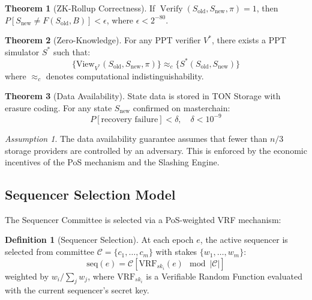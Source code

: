 \documentclass[12pt,a4paper]{article}
\theoremstyle{definition}
\newtheorem{definition}{Definition}[section]
\newtheorem{theorem}{Theorem}[section]
\theoremstyle{remark}
\newtheorem{assumption}{Assumption}[section]
\DeclareMathOperator{\Verify}{Verify}
\begin{document}
\begin{theorem}[ZK-Rollup Correctness]
\label{thm:zk-correctness}
If $\Verify(S_{\text{old}}, S_{\text{new}}, \pi) = 1$, then $P[S_{\text{new}} \neq F(S_{\text{old}}, B)] < \epsilon$, where $\epsilon < 2^{-80}$.
\end{theorem}

\begin{theorem}[Zero-Knowledge]
\label{thm:zk-privacy}
For any PPT verifier $V^*$, there exists a PPT simulator $S^*$ such that:
\begin{equation}
\{\text{View}_{V^*}(S_{\text{old}}, S_{\text{new}}, \pi)\} \approx_c \{S^*(S_{\text{old}}, S_{\text{new}})\}
\end{equation}
where $\approx_c$ denotes computational indistinguishability.
\end{theorem}

\begin{theorem}[Data Availability]
\label{thm:da-guarantee}
State data is stored in TON Storage with erasure coding. For any state $S_{\text{new}}$ confirmed on masterchain:
\begin{equation}
P[\text{recovery failure}] < \delta, \quad \delta < 10^{-9}
\end{equation}
\end{theorem}

\begin{assumption}
The data availability guarantee assumes that fewer than $n/3$ storage providers are controlled by an adversary. This is enforced by the economic incentives of the PoS mechanism and the Slashing Engine.
\end{assumption}

\subsection{Sequencer Selection Model}
\label{sec:sequencer-selection}

The Sequencer Committee is selected via a PoS-weighted VRF mechanism:

\begin{definition}[Sequencer Selection]
At each epoch $e$, the active sequencer is selected from committee $\mathcal{C} = \{c_1, \ldots, c_m\}$ with stakes $\{w_1, \ldots, w_m\}$:
\begin{equation}
\text{seq}(e) = \mathcal{C}\left[\text{VRF}_{sk_i}(e) \mod |\mathcal{C}|\right]
\end{equation}
weighted by $w_i / \sum_j w_j$, where $\text{VRF}_{sk_i}$ is a Verifiable Random Function evaluated with the current sequencer's secret key.
\end{definition}
\end{document}
